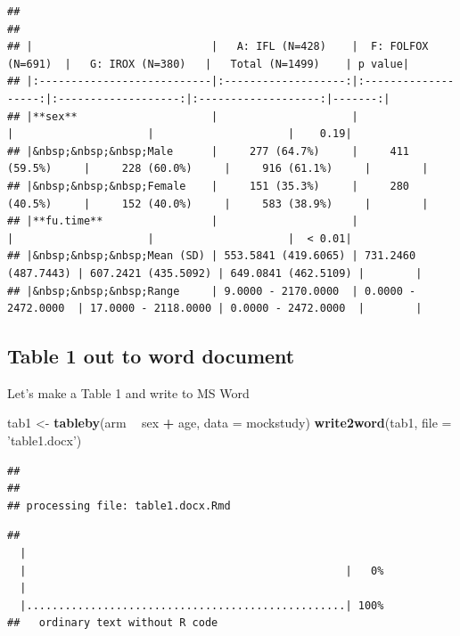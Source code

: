 \documentclass[
]{book}
\newenvironment{Shaded}{\begin{snugshade}}{\end{snugshade}}
\newcommand{\DataTypeTok}[1]{\textcolor[rgb]{0.13,0.29,0.53}{#1}}
\newcommand{\KeywordTok}[1]{\textcolor[rgb]{0.13,0.29,0.53}{\textbf{#1}}}
\newcommand{\NormalTok}[1]{#1}
\newcommand{\OperatorTok}[1]{\textcolor[rgb]{0.81,0.36,0.00}{\textbf{#1}}}
\newcommand{\StringTok}[1]{\textcolor[rgb]{0.31,0.60,0.02}{#1}}
\begin{document}
\begin{verbatim}
## 
## 
## |                            |   A: IFL (N=428)    |  F: FOLFOX (N=691)  |   G: IROX (N=380)   |   Total (N=1499)    | p value|
## |:---------------------------|:-------------------:|:-------------------:|:-------------------:|:-------------------:|-------:|
## |**sex**                     |                     |                     |                     |                     |    0.19|
## |&nbsp;&nbsp;&nbsp;Male      |     277 (64.7%)     |     411 (59.5%)     |     228 (60.0%)     |     916 (61.1%)     |        |
## |&nbsp;&nbsp;&nbsp;Female    |     151 (35.3%)     |     280 (40.5%)     |     152 (40.0%)     |     583 (38.9%)     |        |
## |**fu.time**                 |                     |                     |                     |                     |  < 0.01|
## |&nbsp;&nbsp;&nbsp;Mean (SD) | 553.5841 (419.6065) | 731.2460 (487.7443) | 607.2421 (435.5092) | 649.0841 (462.5109) |        |
## |&nbsp;&nbsp;&nbsp;Range     | 9.0000 - 2170.0000  | 0.0000 - 2472.0000  | 17.0000 - 2118.0000 | 0.0000 - 2472.0000  |        |
\end{verbatim}

\hypertarget{table-1-out-to-word-document}{%
\subsection{Table 1 out to word document}\label{table-1-out-to-word-document}}

Let's make a Table 1 and write to MS Word

\begin{Shaded}
\begin{Highlighting}[]
\NormalTok{tab1 <-}\StringTok{ }\KeywordTok{tableby}\NormalTok{(arm }\OperatorTok{~}\StringTok{ }\NormalTok{sex }\OperatorTok{+}\StringTok{ }\NormalTok{age, }\DataTypeTok{data =}\NormalTok{ mockstudy)}
\KeywordTok{write2word}\NormalTok{(tab1, }\DataTypeTok{file =} \StringTok{'table1.docx'}\NormalTok{)}
\end{Highlighting}
\end{Shaded}

\begin{verbatim}
## 
## 
## processing file: table1.docx.Rmd
\end{verbatim}

\begin{verbatim}
## 
  |                                                        
  |                                                  |   0%
  |                                                        
  |..................................................| 100%
##   ordinary text without R code
\end{verbatim}
\end{document}
